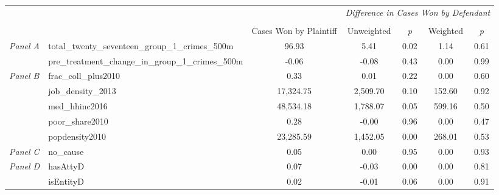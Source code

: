 \begin{tabular}{llccccc}
\toprule
 &  & \textit{} & \multicolumn{4}{c}{\textit{Difference in Cases Won by Defendant}} \\
\cline{4-7}
\\
 &  & Cases Won by Plaintiff & Unweighted & \emph{p} & Weighted & \emph{p} \\
\midrule
\multirow[c]{2}{3cm}{\textit{Panel A}} & total_twenty_seventeen_group_1_crimes_500m & 96.93 & 5.41 & 0.02 & 1.14 & 0.61 \\
 & pre_treatment_change_in_group_1_crimes_500m & -0.06 & -0.08 & 0.43 & 0.00 & 0.99 \\
\cline{1-7}
\multirow[c]{5}{3cm}{\textit{Panel B}} & frac_coll_plus2010 & 0.33 & 0.01 & 0.22 & 0.00 & 0.60 \\
 & job_density_2013 & 17,324.75 & 2,509.70 & 0.10 & 152.60 & 0.92 \\
 & med_hhinc2016 & 48,534.18 & 1,788.07 & 0.05 & 599.16 & 0.50 \\
 & poor_share2010 & 0.28 & -0.00 & 0.96 & 0.00 & 0.47 \\
 & popdensity2010 & 23,285.59 & 1,452.05 & 0.00 & 268.01 & 0.53 \\
\cline{1-7}
\textit{Panel C} & no_cause & 0.05 & 0.00 & 0.95 & 0.00 & 0.93 \\
\cline{1-7}
\multirow[c]{2}{3cm}{\textit{Panel D}} & hasAttyD & 0.07 & -0.03 & 0.00 & 0.00 & 0.81 \\
 & isEntityD & 0.02 & -0.01 & 0.06 & 0.00 & 0.91 \\
\cline{1-7}
\bottomrule
\end{tabular}
